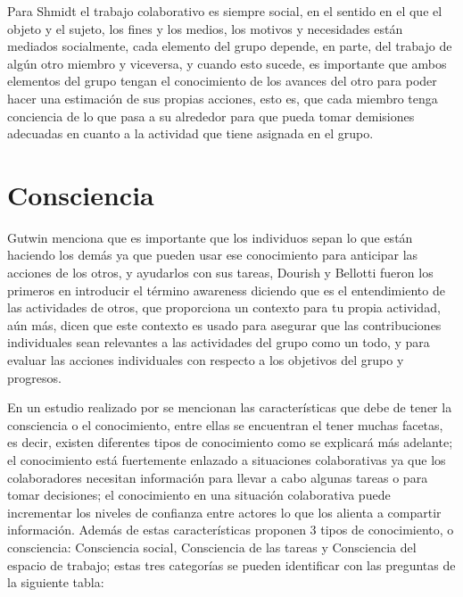 Para Shmidt \cite{schmidt1992taking} el trabajo colaborativo es siempre social, en el sentido en el que el objeto y el sujeto, los fines y los medios, los motivos y necesidades est\'an mediados socialmente, cada elemento del grupo depende, en parte, del trabajo de alg\'un otro miembro y viceversa, y cuando esto sucede, es importante que ambos elementos del grupo tengan el conocimiento de los avances del otro para poder hacer una estimaci\'on de sus propias acciones, esto es, que cada miembro tenga conciencia de lo que pasa a su alrededor para que pueda tomar demisiones adecuadas en cuanto a la actividad que tiene asignada en el grupo.

\section{Consciencia}

Gutwin \cite{gutwin1996supporting} menciona que es importante que los individuos sepan lo que est\'an haciendo los dem\'as ya que pueden usar ese conocimiento para anticipar las acciones de los otros, y ayudarlos con sus tareas, Dourish y Bellotti \cite{dourish1992awareness} fueron los primeros en introducir el t\'ermino awareness diciendo que es el entendimiento de las actividades de otros, que proporciona un contexto para tu propia actividad, a\'un m\'as, dicen que este contexto es usado para asegurar que las contribuciones individuales sean relevantes a las actividades del grupo como un todo, y para evaluar las acciones individuales con respecto a los objetivos del grupo y progresos. 

En un estudio realizado por \cite{Belkadi2013110} se mencionan las caracter\'isticas que debe de tener la consciencia o el conocimiento, entre ellas se encuentran el tener muchas facetas, es decir, existen diferentes tipos de conocimiento como se explicar\'a m\'as adelante; el conocimiento est\'a fuertemente enlazado a situaciones colaborativas ya que los colaboradores necesitan informaci\'on para llevar a cabo algunas tareas o para tomar decisiones; el conocimiento en una situaci\'on colaborativa puede incrementar los niveles de confianza entre actores lo que los alienta a compartir informaci\'on. Adem\'as de estas caracter\'isticas proponen 3 tipos de conocimiento, o consciencia: Consciencia social, Consciencia de las tareas y Consciencia del espacio de trabajo; estas tres categor\'ias se pueden identificar con las preguntas de la siguiente tabla:

